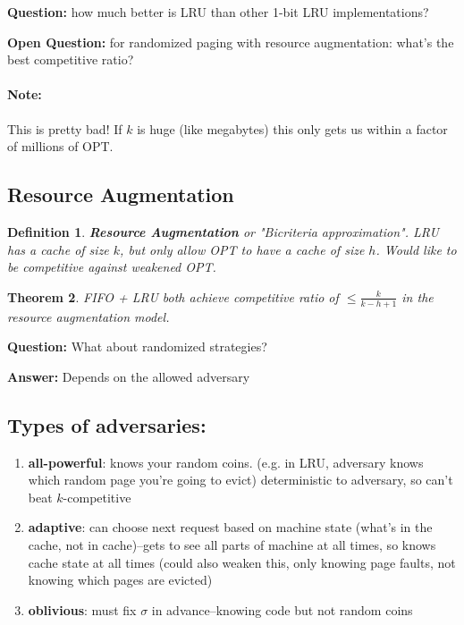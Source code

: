 \documentclass[11pt]{article}
\newtheorem{theorem}{Theorem}
\newtheorem{definition}[theorem]{Definition}
\begin{document}
{\bf Question:} how much better is LRU than other 1-bit LRU implementations?

{\bf Open Question:} for randomized paging with resource augmentation: what's the best competitive ratio?

\paragraph{Note:} This is pretty bad! If $k$ is huge (like megabytes) this only gets us within a factor of millions of OPT.

\subsection{Resource Augmentation}

\begin{definition}
	{\bf Resource Augmentation} \cite{sleat85} or "Bicriteria approximation". LRU has a cache of size $k$, but only allow OPT to have a cache of size $h$. Would like to be competitive against weakened OPT.
\end{definition}

\begin{theorem}
	FIFO + LRU both achieve competitive ratio of $\leq \frac{k}{k-h+1}$ in the resource augmentation model.
\end{theorem}

{\bf Question:} What about randomized strategies?

{\bf Answer:} Depends on the allowed adversary 


\subsection{Types of adversaries:}
\begin{enumerate}
		\renewcommand{\theenumi}{\alph{enumi}}
	\item {\bf all-powerful}: knows your random coins. (e.g. in LRU, adversary knows which random page you're going to evict) deterministic to adversary, so can't beat $k$-competitive
	\item {\bf adaptive}: can choose next request based on machine state (what's in the cache, not in cache)--gets to see all parts of machine at all times, so knows cache state at all times (could also weaken this, only knowing page faults, not knowing which pages are evicted)
	\item {\bf oblivious}: must fix $\sigma$ in advance--knowing code but not random coins
\end{enumerate}
\end{document}
